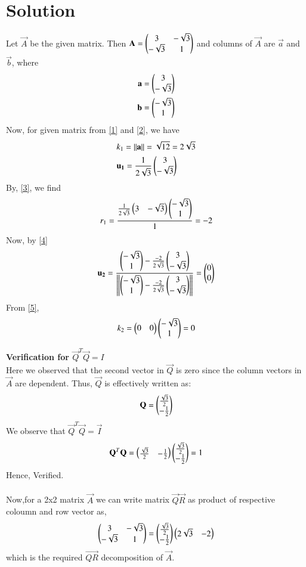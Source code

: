 \documentclass[journal,12pt,twocolumn]{IEEEtran}
\begin{document}
\section{Solution}
Let $\vec{A}$ be the given matrix. Then $\mathbf{A} = \begin{pmatrix}3 & -\sqrt{3} \\ -\sqrt{3} & 1\end{pmatrix}$ and columns of $\vec{A}$ are $\vec{a}$ and $\vec{b}$, where
\begin{align}
	\mathbf{a} = \begin{pmatrix} 3 \\ -\sqrt{3}\end{pmatrix} \\
	\mathbf{b} = \begin{pmatrix} -\sqrt{3} \\1\end{pmatrix}
\end{align}
Now, for given matrix from \eqref{1} and \eqref{2}, we have
\begin{align}
&	k_1 = \left\lVert\mathbf{a}\right\rVert = \sqrt{12} =2\sqrt{3}\\
&	\mathbf{u_1} = \frac{1}{2\sqrt{3}}\begin{pmatrix}3 \\ -\sqrt{3}\end{pmatrix}
\end{align}
By, \eqref{3}, we find
\begin{align}
	r_1 = \frac{\frac{1}{2\sqrt{3}}\begin{pmatrix}3 & -\sqrt{3}\end{pmatrix}\begin{pmatrix}-\sqrt{3} \\ 1\end{pmatrix}}{1} =-2
\end{align}
Now, by \eqref{4}
\begin{align}
	\mathbf{u_2} = \frac{\begin{pmatrix}-\sqrt{3} \\ 1\end{pmatrix}- \frac{-2}{2\sqrt{3}}\begin{pmatrix}3 \\-\sqrt{3}\end{pmatrix}}{\left\lVert\begin{pmatrix}-\sqrt{3} \\ 1\end{pmatrix}- \frac{-2}{2\sqrt{3}}\begin{pmatrix}3 \\-\sqrt{3}\end{pmatrix}\right\rVert} = \begin{pmatrix}0 \\ 0\end{pmatrix}
\end{align}
From \eqref{5},
\begin{align}
	k_2 = \begin{pmatrix}0 & 0\end{pmatrix}\begin{pmatrix}-\sqrt{3}\\ 1\end{pmatrix} = 0
\end{align}

\textbf{Verification for $\vec{Q}^T\vec{Q}=I$}\\
Here we observed that the second vector in $\vec{Q}$ is zero since the column vectors in $\vec{A}$ are dependent. Thus, $\vec{Q}$ is effectively written as:
\begin{align}
\mathbf{Q} = \begin{pmatrix}\frac{\sqrt{3}}{2} \\-\frac{1}{{2}}\end{pmatrix} 
\end{align}
We observe that $\vec{Q}^T\vec{Q} = \vec{I}$
\begin{align}
 \mathbf{Q}^T\mathbf{Q}=\begin{pmatrix}\frac{\sqrt{3}}{2}&-\frac{1}{{2}}\end{pmatrix}\begin{pmatrix}\frac{\sqrt{3}}{2} \\-\frac{1}{{2}}\end{pmatrix} =1  
\end{align}
Hence, Verified.\\ \\
Now,for a 2x2 matrix $\vec{A}$ we can write matrix $\vec{Q}$$\vec{R}$ as product of respective coloumn and row vector as,
\begin{align}
	{\ensuremath{\begin{pmatrix}3 &-\sqrt3 \\ -\sqrt3 & 1\end{pmatrix}}}= \begin{pmatrix}\frac{\sqrt{3}}{2} \\ -\frac{1}{{2}}\end{pmatrix}
	\begin{pmatrix}2\sqrt{3} & -2\end{pmatrix}
\end{align}
which is the required $\vec{QR}$ decomposition of $\vec{A}$.
\end{document}
